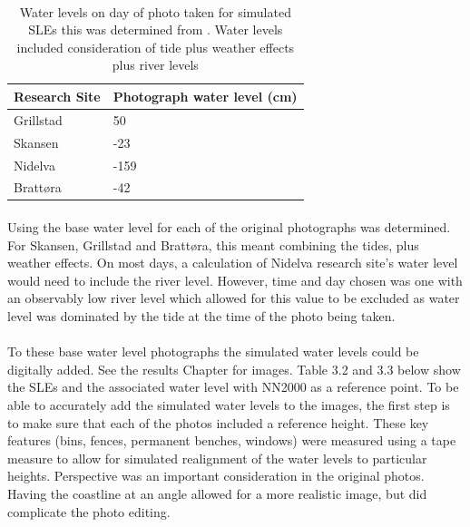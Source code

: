 \paragraph{}

\begin{table}[h!]
    \centering
    \begin{tabular}{|l|l|}
        \hline
     	\textbf{Research Site} & \textbf{Photograph water level (cm)} \\ \hline
            Grillstad & 50 \\ \hline
            Skansen & -23 \\ \hline
            Nidelva & -159 \\ \hline
            Brattøra	& -42 \\ \hline
    \end{tabular}
    \caption{Water levels on day of photo taken for simulated SLEs this was determined from \cite{tides_high_2022}. Water levels included consideration of tide plus weather effects plus river levels}
    \label{tab:water_level_photo}
\end{table}
\paragraph{}

Using \cite{tides_high_2022} the base water level for each of the original photographs was determined. For Skansen, Grillstad and Brattøra, this meant combining the tides, plus weather effects. On most days, a calculation of Nidelva research site's water level would need to include the river level. However, time and day chosen was one with an observably low river level which allowed for this value to be excluded as water level was dominated by the tide at the time of the photo being taken.   
\paragraph{}

To these base water level photographs the simulated water levels could be digitally added. See the results Chapter for images. Table 3.2 and 3.3 below show the SLEs and the associated water level with NN2000 as a reference point.  To be able to accurately add the simulated water levels to the images, the first step is to make sure that each of the photos included a reference height. These key features (bins, fences, permanent benches, windows) were measured using a tape measure to allow for simulated realignment of the water levels to particular heights. Perspective was an important consideration in the original photos. Having the coastline at an angle allowed for a more realistic image, but did complicate the photo editing. 

